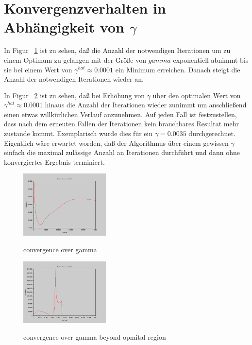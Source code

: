 \documentclass[]{report}
\begin{document}
\section{Konvergenzverhalten in Abh\"angigkeit von $\gamma$}

In Figur ~\ref{fig:ConvergenceOverGamma} ist zu sehen, da{\ss} die Anzahl der notwendigen Iterationen um zu einem Optimum zu gelangen mit der Gr\"o{\ss}e von $gamma$ exponentiell abnimmt bis sie bei einem Wert von $\gamma^{hat} \approx 0.0001$ ein Minimum erreichen. Danach steigt die Anzahl der notwendigen Iterationen wieder an.

In Figur ~\ref{fig:ConvergenceOverGammaWDiverge} ist zu sehen, da{\ss} bei Erh\"ohung von $\gamma$ \"uber den optimalen Wert von $\gamma^{hat} \approx 0.0001$ hinaus die Anzahl der Iterationen wieder zunimmt um anschlie{\ss}end einen etwas willk\"urlichen Verlauf anzunehmen. Auf jeden Fall ist festzustellen, dass nach dem erneuten Fallen der Iterationen kein brauchbares Resultat mehr zustande kommt. Exemplarisch wurde dies f\"ur ein $\gamma=0.0035$ durchgerechnet. Eigentlich w\"are erwartet worden, da{\ss} der Algorithmus \"uber einem gewissen $\gamma$ einfach die maximal zul\"assige Anzahl an Iterationen durchf\"uhrt und dann ohne konvergiertes Ergebnis terminiert.

\begin{figure}[h]
\centering
\includegraphics[width=0.4\textwidth]{./images/ConvergenceOverGamma.jpg} \\
\caption{convergence over gamma}
\label{fig:ConvergenceOverGamma}
\end{figure}

\begin{figure}[h]
\centering
\includegraphics[width=0.4\textwidth]{./images/ConvergenceOverGamma_w_diverge.jpg} \\
\caption{convergence over gamma beyond opmital region}
\label{fig:ConvergenceOverGammaWDiverge}
\end{figure}
\end{document}
